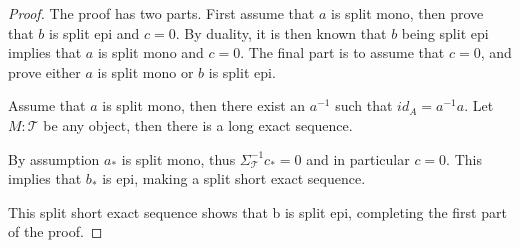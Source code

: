     \begin{proof}
        The proof has two parts. First assume that $a$ is split mono, then prove that $b$ is split epi and $c = 0$. By duality, it is then known that $b$ being split epi implies that $a$ is split mono and $c = 0$. The final part is to assume that $c = 0$, and prove either $a$ is split mono or $b$ is split epi.

        Assume that $a$ is split mono, then there exist an $a^{-1}$ such that $id_A = a^{-1}a$. Let $M:\mathcal{T}$ be any object, then there is a long exact sequence.
        \begin{center}
        \end{center}
        By assumption $a_*$ is split mono, thus $\Sigma_{\mathcal{T}}^{-1}c_* = 0$ and in particular $c = 0$. This implies that $b_*$ is epi, making a split short exact sequence.
        \begin{center}
        \end{center}
        This split short exact sequence shows that b is split epi, completing the first part of the proof.


\end{proof}
